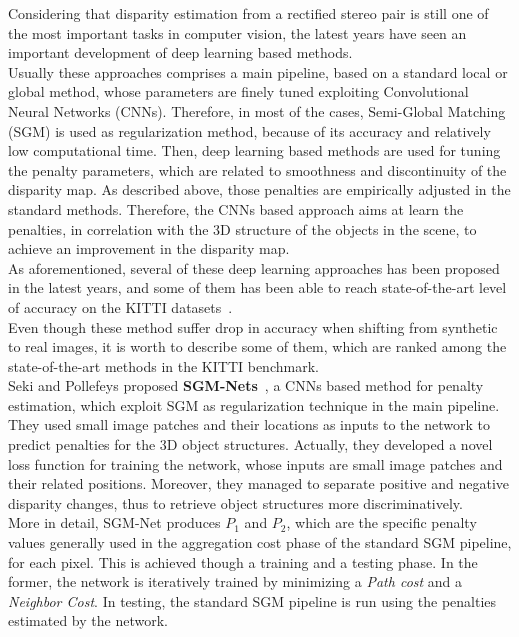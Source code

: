 Considering that disparity estimation from a rectified stereo pair is still one of the most important tasks in computer vision, the latest years have seen an important development of deep learning based methods. \\
Usually these approaches comprises a main pipeline, based on a standard local or global method, whose parameters are finely tuned exploiting Convolutional Neural Networks (CNNs). 
Therefore, in most of the cases, Semi-Global Matching (SGM) is used as regularization method, because of its accuracy and relatively low computational time. 
Then, deep learning based methods are used for tuning the penalty parameters, which are related to smoothness and discontinuity of the disparity map. 
As described above, those penalties are empirically adjusted in the standard methods. 
Therefore, the CNNs based approach aims at learn the penalties, in correlation with the 3D structure of the objects in the scene, to achieve an improvement in the disparity map. \\
As aforementioned, several of these deep learning approaches has been proposed in the latest years, and some of them has been able to reach state-of-the-art level of accuracy on the KITTI datasets~\cite{menze2015object}.\\
Even though these method suffer drop in accuracy when shifting from synthetic to real images, it is worth to describe some of them, which are ranked among the state-of-the-art methods in the KITTI benchmark. \\
Seki and Pollefeys proposed \textbf{SGM-Nets}~\cite{Seki2017}, a CNNs based method for penalty estimation, which exploit SGM as regularization technique in the main pipeline. 
They used small image patches and their locations as inputs to the network to predict penalties for the 3D object structures. 
Actually, they developed a novel loss function for training the network, whose inputs are small image patches and their related positions. 
Moreover, they managed to separate positive and negative disparity changes, thus to retrieve object structures more discriminatively.\\
More in detail, SGM-Net produces $P_1$ and $P_2$, which are the specific penalty values generally used in the aggregation cost phase of the standard SGM pipeline, for each pixel. 
This is achieved though a training and a testing phase. 
In the former, the network is iteratively trained by minimizing a \textit{Path cost} and a \textit{Neighbor Cost}. 
In testing, the standard SGM pipeline is run using the penalties estimated by the network. 
